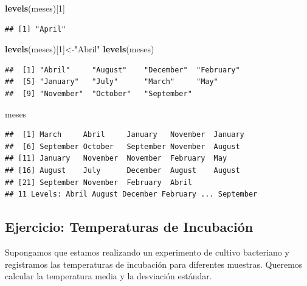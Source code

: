 \documentclass[
]{book}
\newenvironment{Shaded}{\begin{snugshade}}{\end{snugshade}}
\newcommand{\DecValTok}[1]{\textcolor[rgb]{0.00,0.00,0.81}{#1}}
\newcommand{\FunctionTok}[1]{\textcolor[rgb]{0.13,0.29,0.53}{\textbf{#1}}}
\newcommand{\NormalTok}[1]{#1}
\newcommand{\OtherTok}[1]{\textcolor[rgb]{0.56,0.35,0.01}{#1}}
\newcommand{\StringTok}[1]{\textcolor[rgb]{0.31,0.60,0.02}{#1}}
\begin{document}
\begin{Shaded}
\begin{Highlighting}[]
\FunctionTok{levels}\NormalTok{(meses)[}\DecValTok{1}\NormalTok{]}
\end{Highlighting}
\end{Shaded}

\begin{verbatim}
## [1] "April"
\end{verbatim}

\begin{Shaded}
\begin{Highlighting}[]
\FunctionTok{levels}\NormalTok{(meses)[}\DecValTok{1}\NormalTok{]}\OtherTok{\textless{}{-}}\StringTok{"Abril"}
\FunctionTok{levels}\NormalTok{(meses)}
\end{Highlighting}
\end{Shaded}

\begin{verbatim}
##  [1] "Abril"     "August"    "December"  "February" 
##  [5] "January"   "July"      "March"     "May"      
##  [9] "November"  "October"   "September"
\end{verbatim}

\begin{Shaded}
\begin{Highlighting}[]
\NormalTok{meses}
\end{Highlighting}
\end{Shaded}

\begin{verbatim}
##  [1] March     Abril     January   November  January  
##  [6] September October   September November  August   
## [11] January   November  November  February  May      
## [16] August    July      December  August    August   
## [21] September November  February  Abril    
## 11 Levels: Abril August December February ... September
\end{verbatim}

\subsection{Ejercicio: Temperaturas de Incubación}\label{ejercicio-temperaturas-de-incubaciuxf3n}

Supongamos que estamos realizando un experimento de cultivo bacteriano y registramos las temperaturas de incubación para diferentes muestras. Queremos calcular la temperatura media y la desviación estándar.
\end{document}
